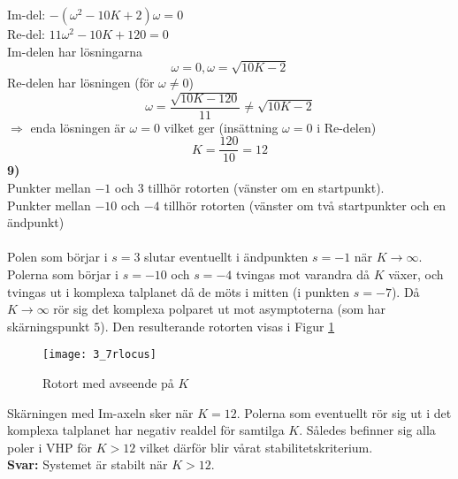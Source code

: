 \documentclass[12pt]{article}
\begin{document}
Im-del: $-(\omega^2-10K+2)\omega = 0$ \\
Re-del: $11\omega^2 - 10K + 120 = 0$ \\
Im-delen har lösningarna
\[\omega = 0, \omega = \sqrt{10K-2}\]
Re-delen har lösningen (för $\omega \neq 0$)
\[\omega = \frac{\sqrt{10K-120}}{11} \neq \sqrt{10K-2}\]
$\Rightarrow$ enda lösningen är $\omega = 0$ vilket ger (insättning $\omega = 0$ i Re-delen)
\[K = \frac{120}{10} = 12\]
\textbf{9)} \\
Punkter mellan $-1$ och $3$ tillhör rotorten (vänster om en startpunkt). \\
Punkter mellan $-10$ och $-4$ tillhör rotorten (vänster om två startpunkter och en ändpunkt) \\\\
Polen som börjar i $s = 3$ slutar eventuellt i ändpunkten $s = -1$ när $K \to \infty$. Polerna som börjar i $s = -10$ och $s = -4$ tvingas mot varandra då $K$ växer, och tvingas ut i komplexa talplanet då de möts i mitten (i punkten $s = -7$). Då $K \to \infty$ rör sig det komplexa polparet ut mot asymptoterna (som har skärningspunkt $5$). Den resulterande rotorten visas i Figur \ref{fig:37rlocus}
\begin{figure}[h!]
  \centering
  \texttt{[image: 3\_7rlocus]}
  \caption{Rotort med avseende på $K$}
  \label{fig:37rlocus}
\end{figure}
Skärningen med Im-axeln sker när $K = 12$. Polerna som eventuellt rör sig ut i det komplexa talplanet har negativ realdel för samtilga $K$. Således befinner sig alla poler i VHP för $K > 12$ vilket därför blir vårat stabilitetskriterium. \\
\textbf{Svar:} Systemet är stabilt när $K > 12$.
\end{document}
